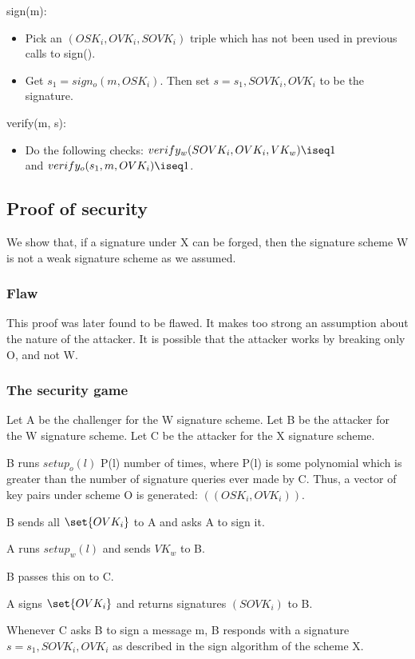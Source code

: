 \documentclass[10pt]{amsart}
\begin{document}
sign(m):
\begin{itemize}
 \item Pick an $(OSK_{i}, OVK_{i}, SOVK_i)$ triple which has not been used in previous calls to sign().
 \item Get $s_1 = sign_o(m, OSK_{i})$. Then set $s = s_1, SOVK_i, OVK_{i}$ to be the signature.
\end{itemize}


verify(m, s):
\begin{itemize}
 \item Do the following checks: $verify_w(SOVK_i, OVK_{i}, VK_w) \iseq 1$ \\and $verify_o(s_1, m, OVK_{i}) \iseq 1$.
\end{itemize}

\subsection{Proof of security}
We show that, if a signature under X can be forged, then the signature scheme W is not a weak signature scheme as we assumed.

\subsubsection{Flaw}
This proof was later found to be flawed. It makes too strong an assumption about the nature of the attacker. It is possible that the attacker works by breaking only O, and not W.

\subsubsection{The security game}
Let A be the challenger for the W signature scheme. Let B be the attacker for the W signature scheme. Let C be the attacker for the X signature scheme.

B runs $setup_o(l)$ P(l) number of times, where P(l) is some polynomial which is greater than the number of signature queries ever made by C. Thus, a vector of key pairs under scheme O is generated: $((OSK_{i}, OVK_{i}))$.

B sends all $\set{OVK_{i}}$ to A and asks A to sign it.

A runs $setup_w(l)$ and sends $VK_w$ to B.

B passes this on to C.

A signs $\set{OVK_{i}}$ and returns signatures $(SOVK_i)$ to B.

Whenever C asks B to sign a message m, B responds with a signature $s = s_1, SOVK_i, OVK_{i}$ as described in the sign algorithm of the scheme X.
\end{document}
